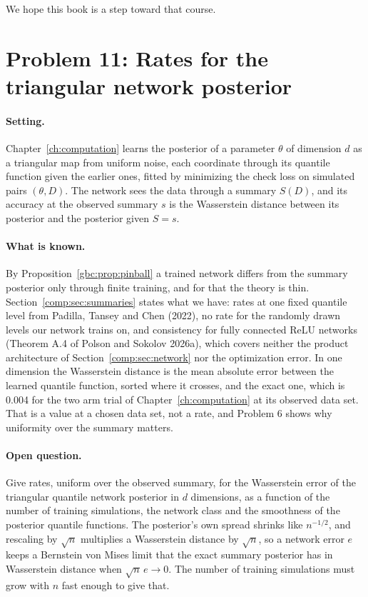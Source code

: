 We hope this book is a step toward that course.

\section{Problem 11: Rates for the triangular network posterior}

\paragraph{Setting.} Chapter~\ref{ch:computation} learns the posterior of a parameter $\theta$ of dimension $d$ as a triangular map from uniform noise, each coordinate through its quantile function given the earlier ones, fitted by minimizing the check loss on simulated pairs $(\theta, D)$. The network sees the data through a summary $S(D)$, and its accuracy at the observed summary $s$ is the Wasserstein distance between its posterior and the posterior given $S = s$.

\paragraph{What is known.} By Proposition~\ref{gbc:prop:pinball} a trained network differs from the summary posterior only through finite training, and for that the theory is thin. Section~\ref{comp:sec:summaries} states what we have: rates at one fixed quantile level from Padilla, Tansey and Chen (2022), no rate for the randomly drawn levels our network trains on, and consistency for fully connected ReLU networks (Theorem A.4 of Polson and Sokolov 2026a), which covers neither the product architecture of Section~\ref{comp:sec:network} nor the optimization error. In one dimension the Wasserstein distance is the mean absolute error between the learned quantile function, sorted where it crosses, and the exact one, which is 0.004 for the two arm trial of Chapter~\ref{ch:computation} at its observed data set. That is a value at a chosen data set, not a rate, and Problem 6 shows why uniformity over the summary matters.

\paragraph{Open question.} Give rates, uniform over the observed summary, for the Wasserstein error of the triangular quantile network posterior in $d$ dimensions, as a function of the number of training simulations, the network class and the smoothness of the posterior quantile functions. The posterior's own spread shrinks like $n^{-1/2}$, and rescaling by $\sqrt{n}$ multiplies a Wasserstein distance by $\sqrt{n}$, so a network error $e$ keeps a Bernstein von Mises limit that the exact summary posterior has in Wasserstein distance when $\sqrt{n}\,e \to 0$. The number of training simulations must grow with $n$ fast enough to give that.

